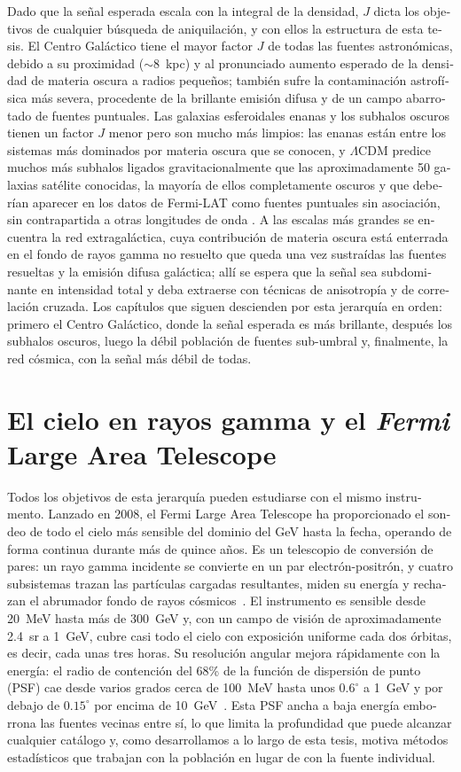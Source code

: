 \begin{otherlanguage}{spanish}
Dado que la señal esperada escala con la integral de la densidad, $J$ dicta los objetivos de cualquier búsqueda de aniquilación, y con ellos la estructura de esta tesis. El Centro Galáctico tiene el mayor factor $J$ de todas las fuentes astronómicas, debido a su proximidad ($\sim 8$~kpc) y al pronunciado aumento esperado de la densidad de materia oscura a radios pequeños; también sufre la contaminación astrofísica más severa, procedente de la brillante emisión difusa y de un campo abarrotado de fuentes puntuales. Las galaxias esferoidales enanas y los subhalos oscuros tienen un factor $J$ menor pero son mucho más limpios: las enanas están entre los sistemas más dominados por materia oscura que se conocen, y $\Lambda$CDM predice muchos más subhalos ligados gravitacionalmente que las aproximadamente 50 galaxias satélite conocidas, la mayoría de ellos completamente oscuros y que deberían aparecer en los datos de Fermi-LAT como fuentes puntuales sin asociación, sin contrapartida a otras longitudes de onda \cite{Springel:2008cc}. A las escalas más grandes se encuentra la red extragaláctica, cuya contribución de materia oscura está enterrada en el fondo de rayos gamma no resuelto que queda una vez sustraídas las fuentes resueltas y la emisión difusa galáctica; allí se espera que la señal sea subdominante en intensidad total y deba extraerse con técnicas de anisotropía y de correlación cruzada. Los capítulos que siguen descienden por esta jerarquía en orden: primero el Centro Galáctico, donde la señal esperada es más brillante, después los subhalos oscuros, luego la débil población de fuentes sub-umbral y, finalmente, la red cósmica, con la señal más débil de todas.

\section*{El cielo en rayos gamma y el \textit{Fermi} Large Area Telescope}
Todos los objetivos de esta jerarquía pueden estudiarse con el mismo instrumento. Lanzado en 2008, el Fermi Large Area Telescope ha proporcionado el sondeo de todo el cielo más sensible del dominio del GeV hasta la fecha, operando de forma continua durante más de quince años. Es un telescopio de conversión de pares: un rayo gamma incidente se convierte en un par electrón-positrón, y cuatro subsistemas trazan las partículas cargadas resultantes, miden su energía y rechazan el abrumador fondo de rayos cósmicos~\cite{Atwood:2009ez}. El instrumento es sensible desde 20~MeV hasta más de 300~GeV y, con un campo de visión de aproximadamente 2.4~sr a 1~GeV, cubre casi todo el cielo con exposición uniforme cada dos órbitas, es decir, cada unas tres horas. Su resolución angular mejora rápidamente con la energía: el radio de contención del 68\% de la función de dispersión de punto (PSF) cae desde varios grados cerca de 100~MeV hasta unos $0.6^\circ$ a 1~GeV y por debajo de $0.15^\circ$ por encima de 10~GeV~\cite{Atwood:2009ez}. Esta PSF ancha a baja energía emborrona las fuentes vecinas entre sí, lo que limita la profundidad que puede alcanzar cualquier catálogo y, como desarrollamos a lo largo de esta tesis, motiva métodos estadísticos que trabajan con la población en lugar de con la fuente individual.


\end{otherlanguage}
